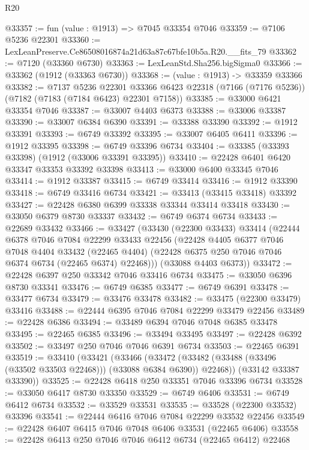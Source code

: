 \begin{lexlean}{R20}
\begin{coremodule}
{@33357 := fun (value : @1913) => @7045 @33354 @7046
@33359 := @7106 @5236 @22301
@33360 := LexLeanPreserve.Ce86508016874a21d63a87c67bfe10b5a.R20.__fits_79
@33362 := @7120 (@33360 @6730)
@33363 := LexLeanStd.Sha256.bigSigma0
@33366 := @33362 (@1912 (@33363 @6730))
@33368 := (value : @1913) -> @33359 @33366
@33382 := @7137
    @5236
    @22301
    @33366
    @6423
    @22318
    (@7166 (@7176 @5236))
    (@7182 (@7183 (@7184 @6423) @22301 @7158))
@33385 := @33000 @6421 @33354 @7046
@33387 := @33007 @4403 @6373
@33388 := @33006 @33387
@33390 := @33007 @6384 @6390
@33391 := @33388 @33390
@33392 := @1912 @33391
@33393 := @6749 @33392
@33395 := @33007 @6405 @6411
@33396 := @1912 @33395
@33398 := @6749 @33396 @6734
@33404 := @33385 (@33393 @33398) (@1912 (@33006 @33391 @33395))
@33410 := @22428 @6401 @6420 @33347 @33353 @33392 @33398
@33413 := @33000 @6400 @33345 @7046
@33414 := @1912 @33387
@33415 := @6749 @33414
@33416 := @1912 @33390
@33418 := @6749 @33416 @6734
@33421 := @33413 (@33415 @33418) @33392
@33427 := @22428 @6380 @6399 @33338 @33344 @33414 @33418
@33430 := @33050 @6379 @8730 @33337
@33432 := @6749 @6374 @6734
@33433 := @22689 @33432
@33466 := @33427
    (@33430
      (@22300 @33433)
      @33414
      (@22444
        @6378
        @7046
        @7084
        @22299
        @33433
        @22456
        (@22428
          @4405
          @6377
          @7046
          @7048
          @4404
          @33432
          (@22465 @4404)
          (@22428 @6375 @250 @7046 @7046 @6374 @6734 (@22465 @6374) @22468)))
      (@33088 @4403 @6373))
@33472 := @22428 @6397 @250 @33342 @7046 @33416 @6734
@33475 := @33050 @6396 @8730 @33341
@33476 := @6749 @6385
@33477 := @6749 @6391
@33478 := @33477 @6734
@33479 := @33476 @33478
@33482 := @33475 (@22300 @33479) @33416
@33488 := @22444 @6395 @7046 @7084 @22299 @33479 @22456
@33489 := @22428 @6386
@33494 := @33489 @6394 @7046 @7048 @6385 @33478
@33495 := @22465 @6385
@33496 := @33494 @33495
@33497 := @22428 @6392
@33502 := @33497 @250 @7046 @7046 @6391 @6734
@33503 := @22465 @6391
@33519 := @33410
    (@33421
      (@33466
        (@33472 (@33482 (@33488 (@33496 (@33502 @33503 @22468))) (@33088 @6384 @6390)) @22468))
      (@33142 @33387 @33390))
@33525 := @22428 @6418 @250 @33351 @7046 @33396 @6734
@33528 := @33050 @6417 @8730 @33350
@33529 := @6749 @6406
@33531 := @6749 @6412 @6734
@33532 := @33529 @33531
@33535 := @33528 (@22300 @33532) @33396
@33541 := @22444 @6416 @7046 @7084 @22299 @33532 @22456
@33549 := @22428 @6407 @6415 @7046 @7048 @6406 @33531 (@22465 @6406)
@33558 := @22428 @6413 @250 @7046 @7046 @6412 @6734 (@22465 @6412) @22468
}
\end{coremodule}
\end{lexlean}
